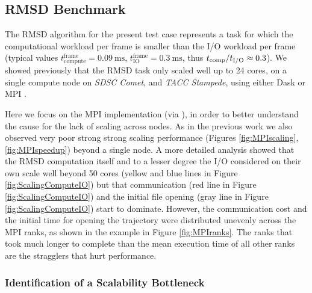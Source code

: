 \label{impl_exp}

\subsection{RMSD Benchmark}
\label{sec:RMSD}
The RMSD algorithm for the present test case represents a task for which the computational workload per frame is smaller than the I/O workload per frame (typical values $t_{\text{compute}}^{\text{frame}} = 0.09\ \text{ms}$, $t_{\text{IO}}^{\text{frame}} = 0.3\ \text{ms}$, thus ${t}_{\text{comp}}/{t}_{\text{I/O}} \approx 0.3$). 
We showed previously that the RMSD task only scaled well up to 24 cores, on a single compute node on \emph{SDSC Comet}, and \emph{TACC Stampede}, using either Dask or MPI \cite{Khoshlessan:2017ab}.

Here we focus on the MPI implementation (via  \cite{Dalcin:2011aa, Dalcin:2005aa}), in order to better understand the cause for the lack of scaling across nodes.
As in the previous work we also observed very poor strong strong scaling performance (Figures \ref{fig:MPIscaling}, \ref{fig:MPIspeedup}) beyond a single node.
A more detailed analysis showed that the RMSD computation itself and to a lesser degree the I/O considered on their own scale well beyond 50 cores (yellow and blue lines in Figure \ref{fig:ScalingComputeIO}) but that communication (red line in Figure \ref{fig:ScalingComputeIO}) and the initial file opening (gray line in Figure \ref{fig:ScalingComputeIO}) start to dominate.
However, the communication cost and the initial time for opening the trajectory were distributed unevenly across the MPI ranks, as shown in the example in Figure \ref{fig:MPIranks}. The ranks that took much longer to complete than the mean execution time of all other ranks are the stragglers that hurt performance.

\subsubsection*{Identification of a Scalability Bottleneck}

